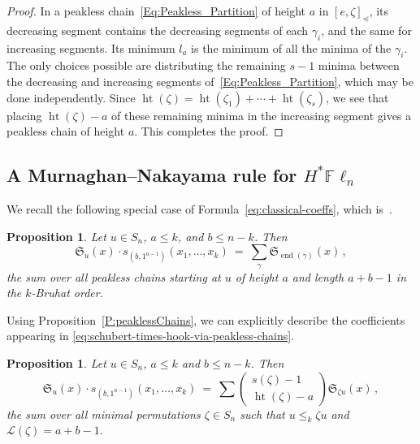 \documentclass[11pt]{article}
\newtheorem{proposition}[theo]{Proposition}
\theoremstyle{definition}
\numberwithin{equation}{section}
\newcommand{\Fln}{{\mathbb F}\ell_n}
\newcommand{\frakS}{{\mathfrak S}}
\newcommand{\calL}{{\mathcal L}}
\DeclareMathOperator{\het}{ht}
\DeclareMathOperator{\nd}{end}
\begin{document}
\begin{proof}
In a peakless chain~\eqref{Eq:Peakless_Partition} of height $a$ in $[e,\zeta]_\preceq$, its decreasing segment contains
the decreasing segments of each $\gamma_i$, and the same for increasing segments.
Its minimum $l_a$ is the minimum of all the minima of the $\gamma_i$.
The only choices possible are distributing the remaining $s{-}1$ minima between the decreasing and increasing segments
of~\eqref{Eq:Peakless_Partition}, which may be done independently.
Since $\het(\zeta)=\het(\zeta_1)+\dotsb+\het(\zeta_s)$, we see that placing $\het(\zeta)-a$ of these remaining minima in
the increasing segment gives a peakless chain of height $a$.
This completes the proof.
\end{proof}

\subsection{A Murnaghan--Nakayama rule for \texorpdfstring{$H^*\Fln$}{H*Fln}}

We recall the following special case of
Formula~\eqref{eq:classical-coeffs}, which is~\cite[Cor. 9]{So96}.


\begin{proposition}
    \label{pieri-formulas-version-2}
    Let $u \in S_n$,  $a\leq k$, and $b\leq n{-}k$. Then
    \begin{equation}
        \label{eq:schubert-times-hook-via-peakless-chains}
        \frakS_u(x)\cdot s_{(b,1^{a-1})}(x_1,\dotsc,x_k)\ =\ \sum_\gamma \frakS_{\nd(\gamma)}(x)\,,
    \end{equation}
    the sum over all peakless chains starting at $u$ of height $a$ and length $a{+}b{-}1$ in the $k$-Bruhat order.
\end{proposition}

Using Proposition~\ref{P:peaklessChains}, we can explicitly describe the coefficients
appearing in \eqref{eq:schubert-times-hook-via-peakless-chains}.

\begin{proposition}\label{P:classical_hook}
    Let $u \in S_n$, $a\leq k$ and $b\leq n{-}k$.
    Then
    \begin{equation}
        \label{Eq:Schubert-times-hook}
        \frakS_u(x) \cdot s_{(b, 1^{a-1})}(x_1,\dotsc,x_k)\ =\
        \sum
        \left(\begin{smallmatrix} s(\zeta)-1 \\ \het(\zeta)-a \end{smallmatrix}\right)
        \frakS_{\zeta u}(x) \,,
    \end{equation}
    the sum over all minimal permutations $\zeta \in S_n$ such that
    $u\leq_k\zeta u$ and $\calL(\zeta)=a+b-1$.
\end{proposition}
\end{document}
